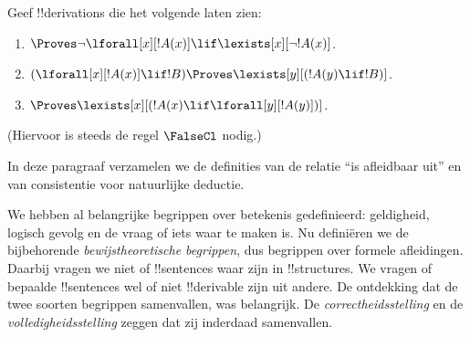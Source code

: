 \documentclass[openany]{memoir}
\begin{document}
\begin{prob}
Geef !!{derivation}s die het volgende laten zien:
\begin{enumerate}
\item $\Proves \lnot\lforall[x][!A(x)] \lif \lexists[x][\lnot!A(x)]$.
\item $(\lforall[x][!A(x)] \lif !B) \Proves \lexists[y][(!A(y) \lif !B)]$.
\item $\Proves \lexists[x][(!A(x) \lif \lforall[y][!A(y)])]$.
\end{enumerate}
(Hiervoor is steeds de regel $\FalseCl$ nodig.)
\end{prob}
\endgroup

\begingroup
\def\olfilename{OLP-0091}
\def\olfilepath{content/first-order-logic/natural-deduction/}
\hypertarget{unit-OLP-0091}{}



      {}
      {}


\begin{editorial}
In deze paragraaf verzamelen we de definities van de relatie
``is afleidbaar uit'' en van consistentie voor natuurlijke deductie.
\end{editorial}

\begin{explain}
We hebben al belangrijke begrippen over betekenis gedefinieerd:
geldigheid, logisch gevolg en de vraag of iets waar te maken is. Nu
definiëren we de bijbehorende \emph{bewijstheoretische begrippen},
dus begrippen over formele afleidingen. Daarbij vragen we niet of
!!{sentence}s waar zijn in !!{structure}s. We vragen of bepaalde
!!{sentence}s wel of niet !!{derivable} zijn uit andere. De ontdekking
dat de twee soorten begrippen samenvallen, was belangrijk. De
\emph{correctheidsstelling} en de \emph{volledigheidsstelling} zeggen
dat zij
inderdaad samenvallen.
\end{explain}
\end{document}

